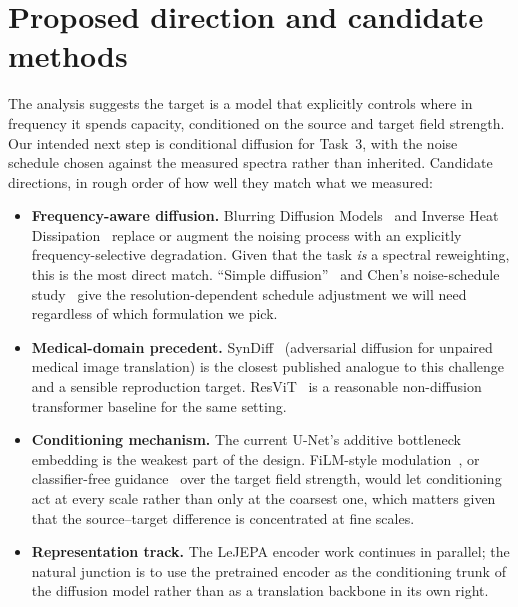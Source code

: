 \documentclass[11pt,a4paper]{article}
\begin{document}
\section{Proposed direction and candidate methods}
\label{sec:direction}

The analysis suggests the target is a model that explicitly controls where in frequency it spends
capacity, conditioned on the source and target field strength. Our intended next step is conditional
diffusion for Task~3, with the noise schedule chosen against the measured spectra rather than inherited.
Candidate directions, in rough order of how well they match what we measured:

\begin{itemize}
  \item \textbf{Frequency-aware diffusion.} Blurring Diffusion Models~\cite{hoogeboom2023blurring} and
  Inverse Heat Dissipation~\cite{rissanen2023ihdm} replace or augment the noising process with an explicitly
  frequency-selective degradation. Given that the task \emph{is} a spectral reweighting, this is the
  most direct match. ``Simple diffusion''~\cite{hoogeboom2023simple} and Chen's noise-schedule
  study~\cite{chen2023noise} give the resolution-dependent schedule adjustment we will need regardless
  of which formulation we pick.

  \item \textbf{Medical-domain precedent.} SynDiff~\cite{ozbey2023syndiff} (adversarial diffusion for unpaired medical image
  translation) is the closest published analogue to this challenge and a sensible reproduction target.
  ResViT~\cite{dalmaz2022resvit} is a reasonable non-diffusion transformer baseline for the same setting.

  \item \textbf{Conditioning mechanism.} The current U-Net's additive bottleneck embedding is the
  weakest part of the design. FiLM-style modulation~\cite{perez2018film}, or classifier-free guidance~\cite{ho2022cfg} over the
  target field strength, would let conditioning act at every scale rather than only at the coarsest one,
  which matters given that the source--target difference is concentrated at fine scales.

  \item \textbf{Representation track.} The LeJEPA encoder work continues in parallel; the natural
  junction is to use the pretrained encoder as the conditioning trunk of the diffusion model rather
  than as a translation backbone in its own right.


\end{itemize}
\end{document}
